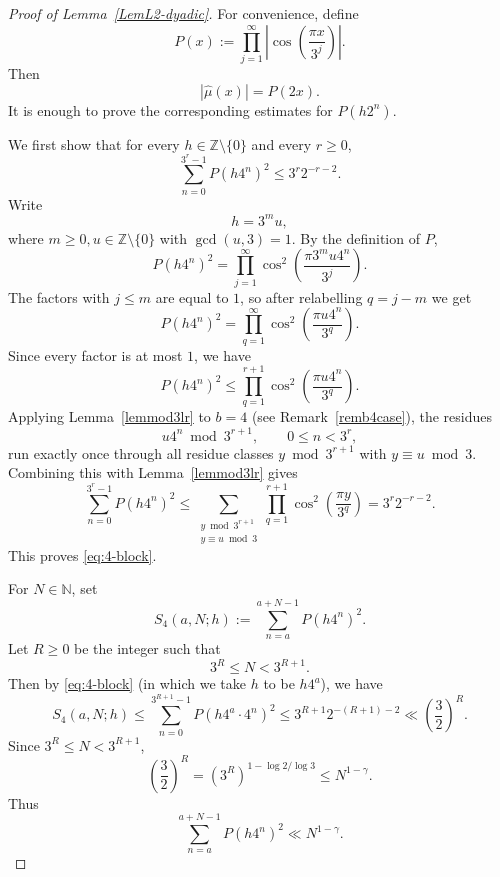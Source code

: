 \documentclass[amssymb,amsfonts,refcheck,12pt,verbatim,righttag]{amsart}
\numberwithin{equation}{section} %
\newcommand{\N}{\mathbb{N}}
\newcommand{\Z}{\mathbb{Z}}
\theoremstyle{plain}
\begin{document}
\begin{proof}[Proof of Lemma~\ref{LemL2-dyadic}]
For convenience,  define
\begin{equation*}
	P(x) := \prod_{j=1}^{\infty}
	\left|\cos\left(\frac{\pi x}{3^j}\right)\right|.
\end{equation*}
Then
\begin{equation*}
	|\widehat\mu(x)| = P(2x).
\end{equation*}	
	It is enough to prove the corresponding estimates for $P(h2^n)$.
	
We first show that  for every $h\in \Z\setminus\{0\}$ and every $r\ge 0$,
	\begin{equation}\label{eq:4-block}
		\sum_{n=0}^{3^r-1} P(h4^{n})^2
		\leq 3^r2^{-r-2}.
	\end{equation}
	Write
	\[
	h=3^m u,\] 
	where  $m\geq0, u\in \Z\setminus\{0\}$ with  $\gcd(u,3)=1$.
	By the definition of $P$,
	\[
	P(h4^{n})^2
	= \prod_{j=1}^{\infty}
	\cos^2\left(\frac{\pi 3^m u4^{n}}{3^j}\right).
	\]
	The factors with $j\leq m$ are equal to $1$, so after relabelling $q=j-m$ we get
	\[
	P(h4^{n})^2
	= \prod_{q=1}^{\infty}
	\cos^2\left(\frac{\pi u4^{n}}{3^q}\right).
	\]
	Since every factor is at most $1$, we have 
\begin{equation*}
		P(h4^{n})^2
		\le
		\prod_{q=1}^{r+1}
		\cos^2\left(\frac{\pi u4^{n}}{3^q}\right).
	\end{equation*}
Applying Lemma~\ref{lemmod3lr} to $b=4$ (see Remark~\ref{remb4case}), the residues
	\[
	u4^{n}\bmod{3^{r+1}},
	\qquad 0\leq n<3^r,
	\]
	run exactly once through all residue classes $y\bmod{3^{r+1}}$ with $y\equiv u\bmod 3$.  Combining this with Lemma~\ref{lemmod3lr} gives
\[\sum_{n=0}^{3^r-1} P(h4^{n})^2
		\leq
		\sum_{\substack{y\bmod 3^{r+1}\\ y\equiv u\bmod 3}}
		\prod_{q=1}^{r+1}
		\cos^2\left(\frac{\pi y}{3^q}\right)=3^r2^{-r-2}.\]
	This proves \eqref{eq:4-block}.
	
For $N\in\N$, set 
	\[
	S_4(a,N;h):=\sum_{n=a}^{a+N-1} P(h4^n)^2.
	\]
Let $R\geq 0$ be the integer such that 
\[3^R\leq N <3^{R+1}.\]
 Then by \eqref{eq:4-block} (in which we take $h$ to be $h4^{a}$),  we have
	\[
	S_4(a,N;h)
	\leq \sum_{n=0}^{3^{R+1}-1}P(h4^{a}\cdot4^{n})^2\leq 3^{R+1}2^{-(R+1)-2}
	\ll \left(\frac32\right)^R.
	\]
	Since $3^{R}\leq N<3^{R+1}$,
	\[
	\left(\frac32\right)^R
	=(3^R)^{1-\log2/\log3}
	\leq N^{1-\gamma}.
	\]
	Thus
	\begin{equation}\label{eq:4-arbitrary}
		\sum_{n=a}^{a+N-1}P(h4^n)^2\ll N^{1-\gamma} .
	\end{equation}
	


\end{proof}
\end{document}
